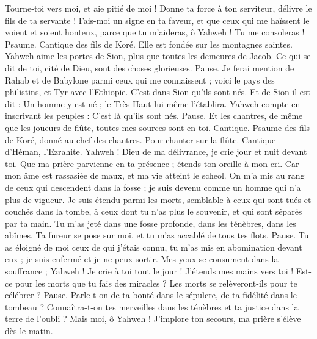 \begin{multicols}{2}
Tourne-toi vers moi, et aie pitié de moi ! Donne ta force à ton serviteur, délivre le fils de ta servante !
Fais-moi un signe en ta faveur, et que ceux qui me haïssent le voient et soient honteux, parce que tu m’aideras, ô Yahweh ! Tu me consoleras !
\VerseOne{}Psaume. Cantique des fils de Koré. Elle est fondée sur les montagnes saintes.
Yahweh aime les portes de Sion, plus que toutes les demeures de Jacob.
Ce qui se dit de toi, cité de Dieu, sont des choses glorieuses. Pause.
Je ferai mention de Rahab et de Babylone parmi ceux qui me connaissent ; voici le pays des philistins, et Tyr avec l’Ethiopie. C’est dans Sion qu’ils sont nés.
Et de Sion il est dit : Un homme y est né ; le Très-Haut lui-même l'établira.
Yahweh compte en inscrivant les peuples : C’est là qu’ils sont nés. Pause.
Et les chantres, de même que les joueurs de flûte, toutes mes sources sont en toi.
\VerseOne{}Cantique. Psaume des fils de Koré, donné au chef des chantres. Pour chanter sur la flûte. Cantique d’Héman, l’Ezrahite.
Yahweh ! Dieu de ma délivrance, je crie jour et nuit devant toi.
Que ma prière parvienne en ta présence ; étends ton oreille à mon cri.
Car mon âme est rassasiée de maux, et ma vie atteint le scheol.
On m'a mis au rang de ceux qui descendent dans la fosse ; je suis devenu comme un homme qui n'a plus de vigueur.
Je suis étendu parmi les morts, semblable à ceux qui sont tués et couchés dans la tombe, à ceux dont tu n’as plus le souvenir, et qui sont séparés par ta main.
Tu m'as jeté dans une fosse profonde, dans les ténèbres, dans les abîmes.
Ta fureur se pose sur moi, et tu m'as accablé de tous tes flots. Pause.
Tu as éloigné de moi ceux de qui j'étais connu, tu m'as mis en abomination devant eux ; je suis enfermé et je ne peux sortir.
Mes yeux se consument dans la souffrance ; Yahweh ! Je crie à toi tout le jour ! J'étends mes mains vers toi !
Est-ce pour les morts que tu fais des miracles ? Les morts se relèveront-ils pour te célébrer ? Pause.
Parle-t-on de ta bonté dans le sépulcre, de ta fidélité dans le tombeau ?
Connaîtra-t-on tes merveilles dans les ténèbres et ta justice dans la terre de l'oubli ?
Mais moi, ô Yahweh ! J’implore ton secours, ma prière s’élève dès le matin.

\end{multicols}
